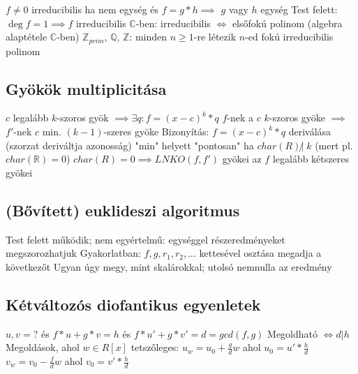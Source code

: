 \documentclass[12pt,a4paper]{article}
\begin{document}
\begin{outline}
	\1 $f \ne 0$ irreducibilis ha nem egység és $f=g*h \implies$ $g$ vagy $h$ egység
	\1 Test felett: $\deg f = 1 \implies f$ irreducibilis
	\1 $\mathbb{C}$-ben: irreducibilis $\Leftrightarrow$ elsőfokú polinom (algebra alaptétele $\mathbb{C}$-ben)
	\1 $\mathbb{Z}_{prim}$, $\mathbb{Q}$, $\mathbb{Z}$: minden $n \ge 1$-re létezik $n$-ed fokú irreducibilis polinom
\end{outline}

\subsection{Gyökök multiplicitása}

\begin{outline}
	\1 $c$ legalább $k$-szoros gyök $\implies \exists q: f=(x-c)^k*q$
	\1 $f$-nek a $c$ $k$-szoros gyöke $\implies$ $f'$-nek $c$ min. $(k-1)$-szeres gyöke
		\2 Bizonyítás: $f=(x-c)^k*q$ deriválása (szorzat deriváltja azonosság)
		\2 "min" helyett "pontosan" ha $char(R) \not | \; k$ (mert pl. $char(\mathbb{R})=0$)
	\1 $char(R)=0 \implies LNKO(f,f')$ gyökei az $f$ legalább kétszeres gyökei
\end{outline}

\subsection{(Bővített) euklideszi algoritmus}

\begin{outline}
	\1 Test felett működik; nem egyértelmű: egységgel részeredményeket megszorozhatjuk
	\1 Gyakorlatban: $f,g,r_1,r_2,...$ kettesével osztása megadja a következőt
	\1 Ugyan úgy megy, mint skalárokkal; utolsó nemnulla az eredmény
\end{outline}

\subsection{Kétváltozós diofantikus egyenletek}

\begin{outline}
	\1 $u,v=?$ \;\; és \;\; $f*u+g*v=h$ \;\; és \;\; $f*u'+g*v'=d=gcd(f,g)$
	\1 Megoldható $\Leftrightarrow d|h$
	\1 Megoldások, ahol $w \in R[x]$ tetszőleges:
		\2 $u_w = u_0+\frac{g}{d}w$ ahol $u_0=u'*\frac{h}{d}$
		\2 $v_w = v_0-\frac{f}{d}w$ ahol $v_0=v'*\frac{h}{d}$
\end{outline}
\end{document}

